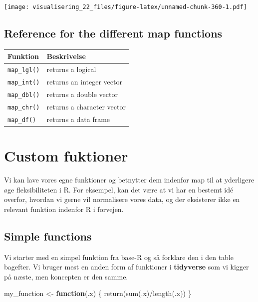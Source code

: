 \documentclass[
]{book}
\newenvironment{Shaded}{\begin{snugshade}}{\end{snugshade}}
\newcommand{\ControlFlowTok}[1]{\textcolor[rgb]{0.13,0.29,0.53}{\textbf{#1}}}
\newcommand{\FunctionTok}[1]{\textcolor[rgb]{0.00,0.00,0.00}{#1}}
\newcommand{\NormalTok}[1]{#1}
\newcommand{\OtherTok}[1]{\textcolor[rgb]{0.56,0.35,0.01}{#1}}
\newcommand{\SpecialCharTok}[1]{\textcolor[rgb]{0.00,0.00,0.00}{#1}}
\begin{document}
\texttt{[image: visualisering\_22\_files/figure-latex/unnamed-chunk-360-1.pdf]}

\hypertarget{reference-for-the-different-map-functions}{%
\subsection{Reference for the different map functions}\label{reference-for-the-different-map-functions}}

\begin{longtable}[]{@{}ll@{}}
\toprule
Funktion & Beskrivelse \\
\midrule
\endhead
\texttt{map\_lgl()} & returns a logical \\
\texttt{map\_int()} & returns an integer vector \\
\texttt{map\_dbl()} & returns a double vector \\
\texttt{map\_chr()} & returns a character vector \\
\texttt{map\_df()} & returns a data frame \\
\bottomrule
\end{longtable}

\hypertarget{custom-fuktioner}{%
\section{Custom fuktioner}\label{custom-fuktioner}}

Vi kan lave vores egne funktioner og betnytter dem indenfor map til at yderligere øge fleksibiliteten i R. For eksempel, kan det være at vi har en bestemt idé overfor, hvordan vi gerne vil normalisere vores data, og der eksisterer ikke en relevant funktion indenfor R i forvejen.

\hypertarget{simple-functions}{%
\subsection{Simple functions}\label{simple-functions}}

Vi starter med en simpel funktion fra base-R og så forklare den i den table bagefter. Vi bruger mest en anden form af funktioner i \textbf{tidyverse} som vi kigger på næste, men koncepten er den samme.

\begin{Shaded}
\begin{Highlighting}[]
\NormalTok{my\_function }\OtherTok{\textless{}{-}} \ControlFlowTok{function}\NormalTok{(.x)}
\NormalTok{\{}
  \FunctionTok{return}\NormalTok{(}\FunctionTok{sum}\NormalTok{(.x)}\SpecialCharTok{/}\FunctionTok{length}\NormalTok{(.x))}
\NormalTok{\}}
\end{Highlighting}
\end{Shaded}
\end{document}
